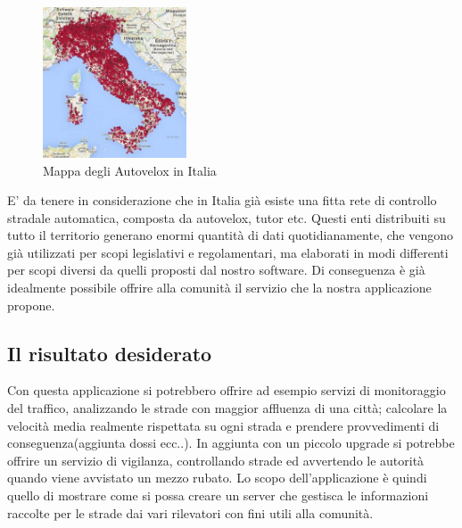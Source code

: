 \documentclass[a4paper,12pt]{report}
\begin{document}
\begin{figure}
  \vspace{-40pt}
  \begin{center}
      \includegraphics[width=0.38\textwidth]{images/mappaAutoveloxItalia}
    \caption{Mappa degli Autovelox in Italia}
    \label{fig:mappaAutoveloxItalia}
  \end{center}
  \vspace{-10pt}
\end{figure}
E' da tenere in considerazione che in Italia già esiste una fitta rete di 
controllo stradale automatica, composta da autovelox, tutor etc. Questi enti 
distribuiti su tutto il territorio generano enormi quantità di dati 
quotidianamente, che vengono già utilizzati per scopi legislativi e 
regolamentari, ma elaborati in modi differenti per scopi diversi da quelli 
proposti dal nostro software. \newline
Di conseguenza è già idealmente possibile offrire alla comunità il servizio che 
la nostra applicazione propone.



\subsection*{Il risultato desiderato}
Con questa applicazione si potrebbero offrire ad esempio servizi di 
monitoraggio del traffico, analizzando le strade con maggior affluenza di una 
città; calcolare la velocità media realmente rispettata su ogni strada e 
prendere provvedimenti di conseguenza(aggiunta dossi ecc..). In aggiunta con un 
piccolo upgrade si potrebbe offrire un servizio di vigilanza, controllando 
strade ed 
avvertendo le autorità quando viene avvistato un mezzo rubato.\newline
Lo scopo dell’applicazione è quindi quello di mostrare come si possa creare un 
server che gestisca le informazioni raccolte per le strade dai vari rilevatori 
con fini utili alla comunità.
\end{document}
